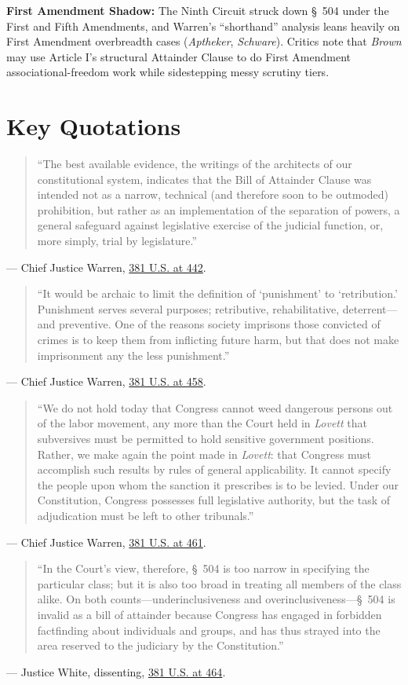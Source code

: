 \documentclass[12pt]{article}
\begin{document}
\textbf{First Amendment Shadow:} The Ninth Circuit struck down \S~504 under the First and Fifth Amendments, and Warren's ``shorthand'' analysis leans heavily on First Amendment overbreadth cases (\textit{Aptheker}, \textit{Schware}). Critics note that \textit{Brown} may use Article I's structural Attainder Clause to do First Amendment associational-freedom work while sidestepping messy scrutiny tiers.

\section{Key Quotations}
\begin{quote}
``The best available evidence, the writings of the architects of our constitutional system, indicates that the Bill of Attainder Clause was intended not as a narrow, technical (and therefore soon to be outmoded) prohibition, but rather as an implementation of the separation of powers, a general safeguard against legislative exercise of the judicial function, or, more simply, trial by legislature.''
\end{quote}
\noindent --- Chief Justice Warren, \href{https://supreme.justia.com/cases/federal/us/381/437/}{381 U.S. at 442}.

\begin{quote}
``It would be archaic to limit the definition of `punishment' to `retribution.' Punishment serves several purposes; retributive, rehabilitative, deterrent---and preventive. One of the reasons society imprisons those convicted of crimes is to keep them from inflicting future harm, but that does not make imprisonment any the less punishment.''
\end{quote}
\noindent --- Chief Justice Warren, \href{https://supreme.justia.com/cases/federal/us/381/437/}{381 U.S. at 458}.

\begin{quote}
``We do not hold today that Congress cannot weed dangerous persons out of the labor movement, any more than the Court held in \textit{Lovett} that subversives must be permitted to hold sensitive government positions. Rather, we make again the point made in \textit{Lovett}: that Congress must accomplish such results by rules of general applicability. It cannot specify the people upon whom the sanction it prescribes is to be levied. Under our Constitution, Congress possesses full legislative authority, but the task of adjudication must be left to other tribunals.''
\end{quote}
\noindent --- Chief Justice Warren, \href{https://supreme.justia.com/cases/federal/us/381/437/}{381 U.S. at 461}.

\begin{quote}
``In the Court's view, therefore, \S~504 is too narrow in specifying the particular class; but it is also too broad in treating all members of the class alike. On both counts---underinclusiveness and overinclusiveness---\S~504 is invalid as a bill of attainder because Congress has engaged in forbidden factfinding about individuals and groups, and has thus strayed into the area reserved to the judiciary by the Constitution.''
\end{quote}
\noindent --- Justice White, dissenting, \href{https://supreme.justia.com/cases/federal/us/381/437/}{381 U.S. at 464}.
\end{document}
